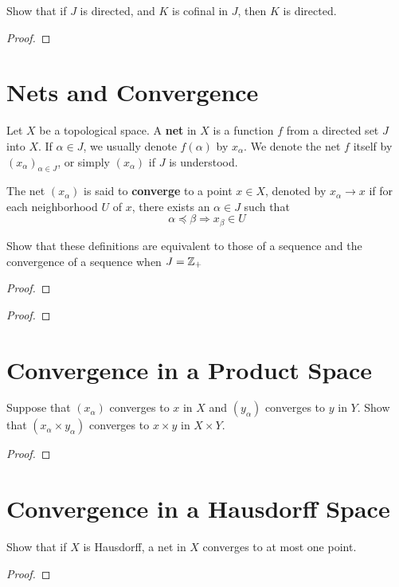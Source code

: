 \documentclass[12pt]{article}
\begin{document}
Show that if $J$ is directed, and $K$ is cofinal in $J$, then $K$ is directed.

\begin{proof}
\end{proof}

\section{Nets and Convergence}
\begin{defn}
    Let $X$ be a topological space. A \textbf{net} in $X$ is a function $f$ from a directed set $J$ into $X$. If $\alpha \in J$, we usually denote $f(\alpha)$ by $x_\alpha$. We denote the net $f$ itself by ${\left(x_\alpha\right)}_{\alpha \in J}$, or simply $(x_\alpha)$ if $J$ is understood.
\end{defn}
\begin{defn}
    The net $(x_\alpha)$ is said to \textbf{converge} to a point $x \in X$, denoted by $x_\alpha \to x$ if for each neighborhood $U$ of $x$, there exists an $\alpha \in J$ such that
    \[\alpha \preceq \beta \Longrightarrow x_\beta \in U\]
\end{defn}

Show that these definitions are equivalent to those of a sequence and the convergence of a sequence when $J = \mathbb{Z}_+$

\begin{proof}
\end{proof}
\begin{proof}
\end{proof}

\section{Convergence in a Product Space}
Suppose that $(x_\alpha)$ converges to $x$ in $X$ and $(y_\alpha)$ converges to $y$ in $Y$. Show that $(x_\alpha \times y_\alpha)$ converges to $x \times y$ in $X \times Y$.
\begin{proof}
\end{proof}

\section{Convergence in a Hausdorff Space}
Show that if $X$ is Hausdorff, a net in $X$ converges to at most one point.
\begin{proof}
\end{proof}
\end{document}
